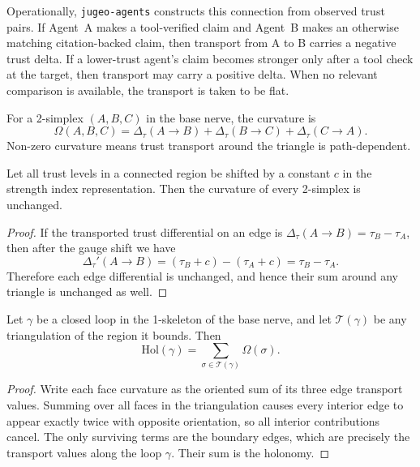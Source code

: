 \documentclass[11pt]{article}
\newcommand{\Curv}{\Omega}
\newcommand{\Hol}{\mathrm{Hol}}
\newcommand{\TrustVar}{\tau}
\newcommand{\Transport}{\Delta_{\tau}}
\newcommand{\JuGeoAgents}{\texttt{jugeo-agents}}
\begin{document}
Operationally, \JuGeoAgents{} constructs this connection from observed trust
pairs.  If Agent~A makes a tool-verified claim and Agent~B makes an otherwise
matching citation-backed claim, then transport from A to B carries a negative
trust delta.  If a lower-trust agent's claim becomes stronger only after a tool
check at the target, then transport may carry a positive delta.  When no
relevant comparison is available, the transport is taken to be flat.

\begin{definition}[Curvature]
For a 2-simplex $(A,B,C)$ in the base nerve, the curvature is
\[
  \Curv(A,B,C) = \Transport(A\to B) + \Transport(B\to C) + \Transport(C\to A).
\]
Non-zero curvature means trust transport around the triangle is path-dependent.
\end{definition}

\begin{theorem}
Let all trust levels in a connected region be shifted by a constant $c$ in the
strength index representation.  Then the curvature of every 2-simplex is
unchanged.
\end{theorem}

\begin{proof}
If the transported trust differential on an edge is
$\Transport(A\to B)=\TrustVar_B-\TrustVar_A$, then after the gauge shift we have
\[
  \Transport'(A\to B) = (\TrustVar_B+c) - (\TrustVar_A+c) = \TrustVar_B-\TrustVar_A.
\]
Therefore each edge differential is unchanged, and hence their sum around any
triangle is unchanged as well.
\end{proof}

\begin{theorem}
Let $\gamma$ be a closed loop in the 1-skeleton of the base nerve, and let
$\mathcal{T}(\gamma)$ be any triangulation of the region it bounds.  Then
\[
  \Hol(\gamma) = \sum_{\sigma \in \mathcal{T}(\gamma)} \Curv(\sigma).
\]
\end{theorem}

\begin{proof}
Write each face curvature as the oriented sum of its three edge transport
values.  Summing over all faces in the triangulation causes every interior edge
to appear exactly twice with opposite orientation, so all interior contributions
cancel.  The only surviving terms are the boundary edges, which are precisely
the transport values along the loop $\gamma$.  Their sum is the holonomy.
\end{proof}
\end{document}
